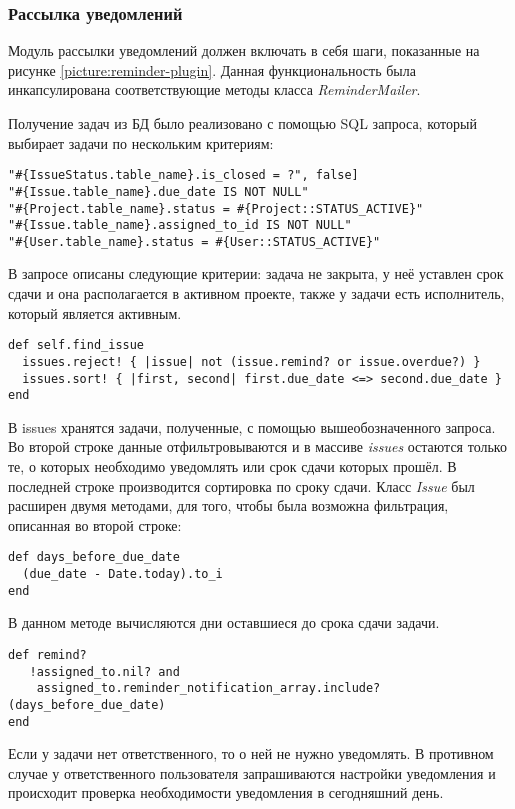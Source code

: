\subsubsection{Рассылка уведомлений}
Модуль рассылки уведомлений должен включать в себя шаги, показанные на рисунке
\ref{picture:reminder-plugin}. Данная функциональность была инкапсулирована
соответствующие методы класса \textit{ReminderMailer}.

Получение задач из БД было реализовано с помощью SQL запроса, который выбирает
задачи по нескольким критериям:
\small{\begin{lstlisting}
"#{IssueStatus.table_name}.is_closed = ?", false]
"#{Issue.table_name}.due_date IS NOT NULL"
"#{Project.table_name}.status = #{Project::STATUS_ACTIVE}"
"#{Issue.table_name}.assigned_to_id IS NOT NULL"
"#{User.table_name}.status = #{User::STATUS_ACTIVE}"
\end{lstlisting}}
В запросе описаны следующие критерии: задача не закрыта, у неё уставлен срок
сдачи и она располагается в активном проекте, также у задачи есть исполнитель,
который является активным. 
\small{\begin{lstlisting}
def self.find_issue
  issues.reject! { |issue| not (issue.remind? or issue.overdue?) }
  issues.sort! { |first, second| first.due_date <=> second.due_date }
end
\end{lstlisting}}
В issues хранятся задачи, полученные, с помощью вышеобозначенного запроса. Во
второй строке данные отфильтровываются и в массиве \textit{issues} остаются
только те, о которых необходимо уведомлять или срок сдачи которых прошёл. В
последней строке производится сортировка по сроку сдачи. Класс \textit{Issue}
был расширен двумя методами, для того, чтобы была возможна фильтрация,
описанная во второй строке:
\small{\begin{lstlisting}
def days_before_due_date
  (due_date - Date.today).to_i
end
\end{lstlisting}}
В данном методе вычисляются дни оставшиеся до срока сдачи задачи.
\small{\begin{lstlisting}
def remind?
   !assigned_to.nil? and
    assigned_to.reminder_notification_array.include?(days_before_due_date)
end
\end{lstlisting}}
Если у задачи нет ответственного, то о ней не нужно уведомлять. В противном
случае у ответственного пользователя запрашиваются настройки уведомления и
происходит проверка необходимости уведомления в сегодняшний день.

